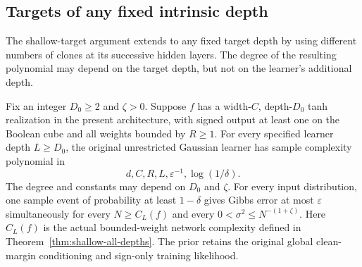 \subsection{Targets of any fixed intrinsic depth}
\label{sec:fixed-intrinsic-depth}

The shallow-target argument extends to any fixed target depth by using
different numbers of clones at its successive hidden layers. The degree
of the resulting polynomial may depend on the target depth, but not on
the learner's additional depth.

\begin{corollary}
\label{cor:fixed-intrinsic-depth}
Fix an integer $D_0\ge2$ and $\zeta>0$. Suppose $f$ has a width-$C$,
depth-$D_0$ tanh realization in the present architecture, with signed
output at least one on the Boolean cube and all weights bounded by
$R\ge1$. For every specified learner depth $L\ge D_0$, the original
unrestricted Gaussian learner has sample complexity polynomial in
\[
 d,C,R,L,\varepsilon^{-1},\log(1/\delta).
\]
The degree and constants may depend on $D_0$ and $\zeta$.
For every input distribution, one sample event of probability at least
$1-\delta$ gives Gibbs error at most $\varepsilon$ simultaneously for
every $N\ge C_L(f)$ and every
$0<\sigma^2\le N^{-(1+\zeta)}$.
Here $C_L(f)$ is the actual bounded-weight network complexity defined in
Theorem~\ref{thm:shallow-all-depths}. The prior retains the original
global clean-margin conditioning and sign-only training likelihood.
\end{corollary}

